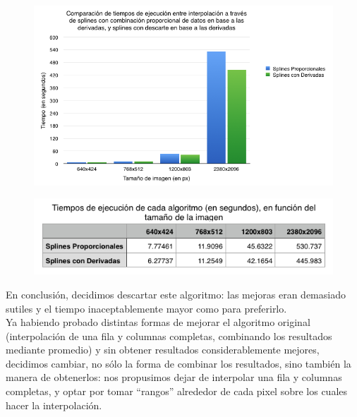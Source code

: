 \documentclass[a4paper]{article}
\begin{document}
\begin{figure}[h!]
    \begin{center}
    \includegraphics[scale=0.65]{imagenes/tiempos/propderg.png}
    \label{tiemposrang}
  \end{center}
\end{figure}

\begin{figure}[h!]
    \begin{center}
    \includegraphics[scale=0.70]{imagenes/tiempos/propdert.png}
    \label{tiempos1}
  \end{center}
\end{figure}

En conclusión, decidimos descartar este algoritmo: las mejoras eran demasiado sutiles y el tiempo inaceptablemente mayor como para preferirlo.\\

Ya habiendo probado distintas formas de mejorar el algoritmo original (interpolación de una fila y columnas completas, combinando los resultados mediante promedio) y sin obtener resultados considerablemente mejores, decidimos cambiar, no sólo la forma de combinar los resultados, sino también la manera de obtenerlos: nos propusimos dejar de interpolar una fila y columnas completas, y optar por tomar ``rangos'' alrededor de cada pixel sobre los cuales hacer la interpolación. \\
\end{document}
